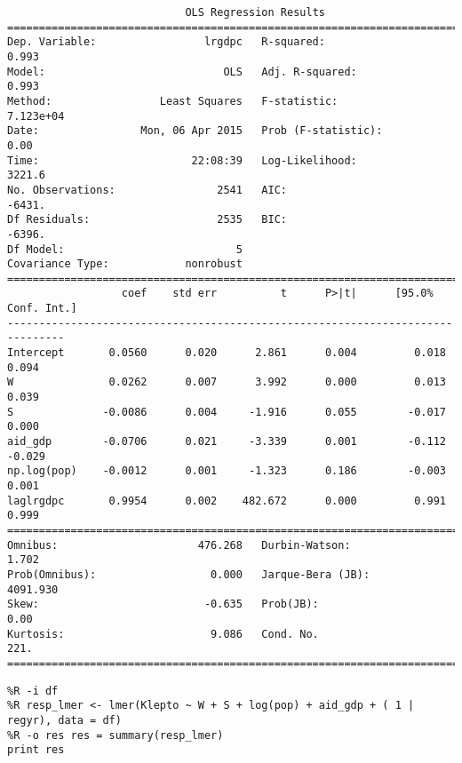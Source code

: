 \documentclass[12pt,fleqn]{article}\usepackage{common}
\begin{document}
\begin{verbatim}
                            OLS Regression Results                            
==============================================================================
Dep. Variable:                 lrgdpc   R-squared:                       0.993
Model:                            OLS   Adj. R-squared:                  0.993
Method:                 Least Squares   F-statistic:                 7.123e+04
Date:                Mon, 06 Apr 2015   Prob (F-statistic):               0.00
Time:                        22:08:39   Log-Likelihood:                 3221.6
No. Observations:                2541   AIC:                            -6431.
Df Residuals:                    2535   BIC:                            -6396.
Df Model:                           5                                         
Covariance Type:            nonrobust                                         
===============================================================================
                  coef    std err          t      P>|t|      [95.0% Conf. Int.]
-------------------------------------------------------------------------------
Intercept       0.0560      0.020      2.861      0.004         0.018     0.094
W               0.0262      0.007      3.992      0.000         0.013     0.039
S              -0.0086      0.004     -1.916      0.055        -0.017     0.000
aid_gdp        -0.0706      0.021     -3.339      0.001        -0.112    -0.029
np.log(pop)    -0.0012      0.001     -1.323      0.186        -0.003     0.001
laglrgdpc       0.9954      0.002    482.672      0.000         0.991     0.999
==============================================================================
Omnibus:                      476.268   Durbin-Watson:                   1.702
Prob(Omnibus):                  0.000   Jarque-Bera (JB):             4091.930
Skew:                          -0.635   Prob(JB):                         0.00
Kurtosis:                       9.086   Cond. No.                         221.
==============================================================================

\end{verbatim}


\begin{verbatim}
%R -i df
%R resp_lmer <- lmer(Klepto ~ W + S + log(pop) + aid_gdp + ( 1 | regyr), data = df)
%R -o res res = summary(resp_lmer)
print res
\end{verbatim}
\end{document}
